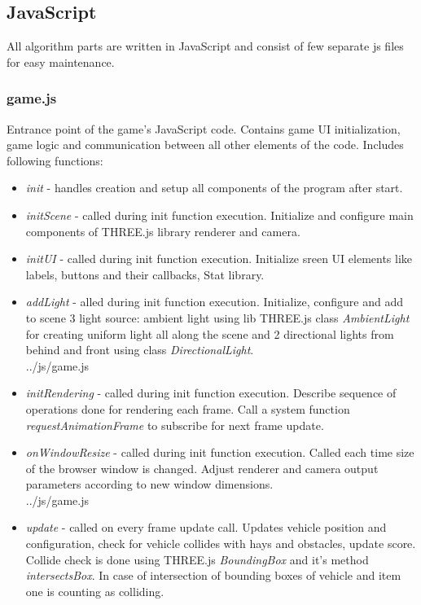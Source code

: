 \documentclass[12pt]{article}
\begin{document}
\subsection{JavaScript}
All algorithm parts are written in JavaScript and consist of few separate js files for easy maintenance.
\subsubsection{game.js}
Entrance point of the game's JavaScript code. Contains game UI initialization, game logic and communication between all other elements of the code.
Includes following functions:
\begin{itemize}
\item \textit{init} - handles creation and setup all components of the program after start.
\item \textit{initScene} - called during init function execution. Initialize and configure main components of THREE.js library renderer and camera.
\item \textit{initUI} - called during init function execution. Initialize sreen UI elements like labels, buttons and their callbacks, Stat library.
\item \textit{addLight} - alled during init function execution. Initialize, configure and add to scene 3 light source: ambient light using lib THREE.js class \textit{AmbientLight} for creating uniform light all along the scene and 2 directional lights from behind and front using class \textit{DirectionalLight}.
\\

{../js/game.js}

\item \textit{initRendering} - called during init function execution. Describe sequence of operations done for rendering each frame. Call a system function \textit{requestAnimationFrame} to subscribe for next frame update.
\item \textit{onWindowResize} - called during init function execution. Called each time size of the browser window is changed. Adjust renderer and camera output parameters according to new window dimensions.
\\

{../js/game.js}

\item \textit{update} - called on every frame update call. Updates vehicle position and configuration, check for vehicle collides with hays and obstacles, update score. Collide check is done using THREE.js \textit{BoundingBox} and it's method \textit{intersectsBox}. In case of intersection of bounding boxes of vehicle and item one is counting as colliding.
\end{itemize}
\end{document}

